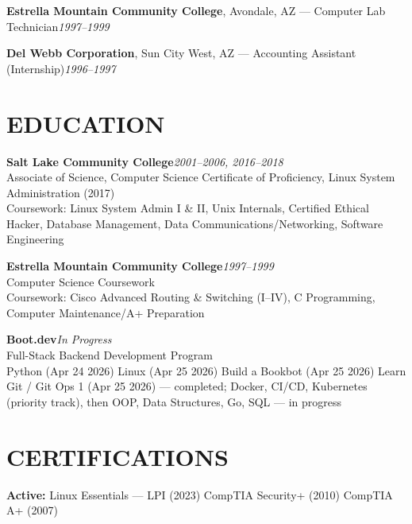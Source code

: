 \documentclass[9pt,letterpaper]{extarticle}
\begin{document}
\vspace{3pt}
\noindent\textbf{Estrella Mountain Community College}, Avondale, AZ --- Computer Lab Technician\hfill\textit{1997--1999}

\vspace{3pt}
\noindent\textbf{Del Webb Corporation}, Sun City West, AZ --- Accounting Assistant (Internship)\hfill\textit{1996--1997}

\section*{EDUCATION}

\noindent\textbf{Salt Lake Community College}\hfill\textit{2001--2006, 2016--2018}\\
Associate of Science, Computer Science \textbullet{} Certificate of Proficiency, Linux System Administration (2017)\\
Coursework: Linux System Admin I \& II, Unix Internals, Certified Ethical Hacker, Database Management, Data Communications/Networking, Software Engineering

\vspace{4pt}
\noindent\textbf{Estrella Mountain Community College}\hfill\textit{1997--1999}\\
Computer Science Coursework\\
Coursework: Cisco Advanced Routing \& Switching (I--IV), C Programming, Computer Maintenance/A+ Preparation

\vspace{4pt}
\noindent\textbf{Boot.dev}\hfill\textit{In Progress}\\
Full-Stack Backend Development Program\\
Python (Apr 24 2026) \textbullet{} Linux (Apr 25 2026) \textbullet{} Build a Bookbot (Apr 25 2026) \textbullet{} Learn Git / Git Ops 1 (Apr 25 2026) --- completed; Docker, CI/CD, Kubernetes (priority track), then OOP, Data Structures, Go, SQL --- in progress

\section*{CERTIFICATIONS}

\textbf{Active:} Linux Essentials --- LPI (2023) \textbullet{} CompTIA Security+ (2010) \textbullet{} CompTIA A+ (2007)
\end{document}
